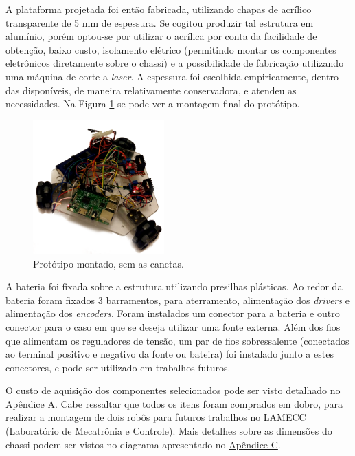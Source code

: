 A plataforma projetada foi então fabricada, utilizando chapas de acrílico transparente de 5 mm de espessura. Se cogitou produzir tal estrutura em alumínio, porém optou-se por utilizar o acrílica por conta da facilidade de obtenção, baixo custo, isolamento elétrico (permitindo montar os componentes eletrônicos diretamente sobre o chassi) e a possibilidade de fabricação utilizando uma máquina de corte a \textit{laser}. A espessura foi escolhida empiricamente, dentro das disponíveis, de maneira relativamente conservadora, e atendeu as necessidades. Na Figura \ref{fig:montagem} se pode ver a montagem final do protótipo.

\begin{figure}[h]
  \centering
  \includegraphics[width = 0.45\textwidth]{imagens/roboto}
  \caption{Protótipo montado, sem as canetas.}
  \label{fig:montagem}
\end{figure}

A bateria foi fixada sobre a estrutura utilizando presilhas plásticas. Ao redor da bateria foram fixados 3 barramentos, para aterramento, alimentação dos \textit{drivers} e alimentação dos \textit{encoders}. Foram instalados um conector para a bateria e outro conector para o caso em que se deseja utilizar uma fonte externa.  Além dos fios que alimentam os reguladores de tensão, um par de fios sobressalente (conectados ao terminal positivo e negativo da fonte ou bateira) foi instalado junto a estes conectores, e pode ser utilizado em trabalhos futuros.

O custo de aquisição dos componentes selecionados pode ser visto detalhado no \hyperref[sec:custo]{Apêndice A}. Cabe ressaltar que todos os itens foram comprados em dobro, para realizar a montagem de dois robôs para futuros trabalhos no LAMECC (Laboratório de Mecatrônia e Controle). Mais detalhes sobre as dimensões do chassi podem ser vistos no diagrama apresentado no \hyperref[sec:draw]{Apêndice C}.

